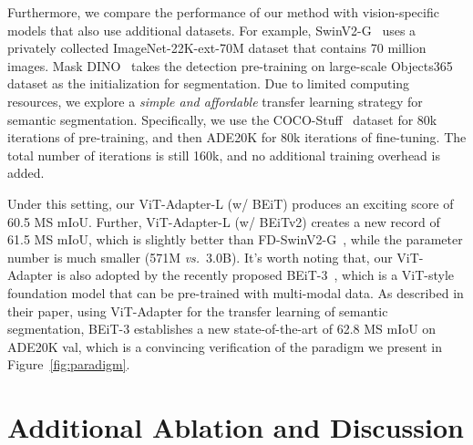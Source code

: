 \documentclass{article} \usepackage{iclr2023_conference,times}
\begin{document}
Furthermore, we compare the performance of our method with vision-specific models that also use additional datasets.
For example, SwinV2-G~\citep{liu2021swinv2} uses a privately collected ImageNet-22K-ext-70M dataset that contains 70 million images.
Mask DINO~\citep{li2022maskdino} takes the detection pre-training on large-scale Objects365~\citep{shao2019objects365} dataset as the initialization for segmentation.
Due to limited computing resources, we explore a \emph{simple and affordable} transfer learning strategy for semantic segmentation.
Specifically, we use the COCO-Stuff~\citep{caesar2018coco} dataset for 80k iterations of pre-training, and then ADE20K for 80k iterations of fine-tuning.
The total number of iterations is still 160k, and no additional training overhead is added.

Under this setting, our ViT-Adapter-L (w/ BEiT) produces an exciting score of 60.5 MS mIoU. Further, ViT-Adapter-L (w/ BEiTv2) creates a new record of 61.5 MS mIoU, which is slightly better than FD-SwinV2-G~\citep{wei2022kdswin}, while the parameter number is much smaller (571M \emph{vs.}~3.0B). 
It's worth noting that, our ViT-Adapter is also adopted by the recently proposed BEiT-3~\citep{wang2022beit3}, which is a ViT-style foundation model that can be pre-trained with multi-modal data.
As described in their paper, using ViT-Adapter for the transfer learning of semantic segmentation,
BEiT-3 establishes a new state-of-the-art of 62.8 MS mIoU on ADE20K val, which is a convincing verification of the paradigm we present in Figure~\ref{fig:paradigm}.


\section{Additional Ablation and Discussion}
\end{document}
